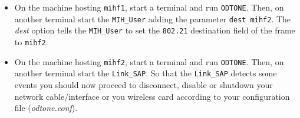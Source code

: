 \documentclass[11pt]{article}
\begin{document}
\begin{itemize}

 \item  On the machine hosting \texttt{mihf1}, start a terminal and run \texttt{ODTONE}.
	Then, on another terminal start the \texttt{MIH\_User} adding the parameter
	\texttt{\textendash\textendash dest mihf2}.
%
%
%
%
%
     The \emph{\textendash\textendash dest} option tells the \texttt{MIH\_User} to set the \texttt{802.21}
     destination field of the frame to \texttt{mihf2}.

 \item  On the machine hosting \texttt{mihf2}, start a terminal and run \texttt{ODTONE}.
	Then, on another terminal start the \texttt{Link\_SAP}. So that the \texttt{Link\_SAP}
	detects some events you should now proceed to disconnect, disable or shutdown your
	network cable/interface or you wireless card according to your configuration file (\textit{odtone.conf}).

%
%
%
%
%

\end{itemize}
\end{document}
